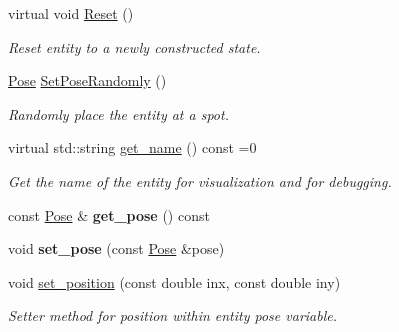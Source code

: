 \begin{DoxyCompactItemize}
\mbox{\label{class_arena_entity_abaebe6c02659e22c08579d49829c5676}} 
virtual void \mbox{\hyperlink{class_arena_entity_abaebe6c02659e22c08579d49829c5676}{Reset}} ()
\begin{DoxyCompactList}\small\item\em Reset entity to a newly constructed state. \end{DoxyCompactList}\item 
\mbox{\label{class_arena_entity_ad9d597b105a901a79c45cbf704c115d0}} 
\mbox{\hyperlink{struct_pose}{Pose}} \mbox{\hyperlink{class_arena_entity_ad9d597b105a901a79c45cbf704c115d0}{Set\+Pose\+Randomly}} ()
\begin{DoxyCompactList}\small\item\em Randomly place the entity at a spot. \end{DoxyCompactList}\item 
virtual std\+::string \mbox{\hyperlink{class_arena_entity_ad43152003033cf01ad86eeff1990b69a}{get\+\_\+name}} () const =0
\begin{DoxyCompactList}\small\item\em Get the name of the entity for visualization and for debugging. \end{DoxyCompactList}\item 
\mbox{\label{class_arena_entity_a9a0efa995da3ed55e92f54357fd2bdae}} 
const \mbox{\hyperlink{struct_pose}{Pose}} \& {\bfseries get\+\_\+pose} () const
\item 
\mbox{\label{class_arena_entity_a6eb76e5f1b5949314c12cc512d6930ae}} 
void {\bfseries set\+\_\+pose} (const \mbox{\hyperlink{struct_pose}{Pose}} \&pose)
\item 
\mbox{\label{class_arena_entity_a3136704edf07c24639319abf5c28dac0}} 
void \mbox{\hyperlink{class_arena_entity_a3136704edf07c24639319abf5c28dac0}{set\+\_\+position}} (const double inx, const double iny)
\begin{DoxyCompactList}\small\item\em Setter method for position within entity pose variable. \end{DoxyCompactList}\item 
\mbox{\label{class_arena_entity_ac1cc3c6997bc7a9573128fc5ded9eb72}} 

\end{DoxyCompactItemize}
